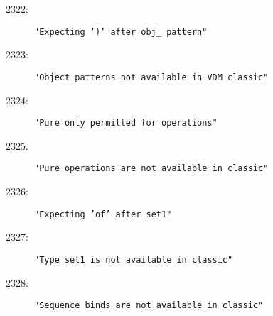 \begin{description}
\item[2322:] \texttt{"Expecting ')' after obj\_ pattern"}
\item[2323:] \texttt{"Object patterns not available in VDM classic"}
\item[2324:] \texttt{"Pure only permitted for operations"}
\item[2325:] \texttt{"Pure operations are not available in classic"}
\item[2326:] \texttt{"Expecting 'of' after set1"}
\item[2327:] \texttt{"Type set1 is not available in classic"}
\item[2328:] \texttt{"Sequence binds are not available in classic"}

\end{description}
